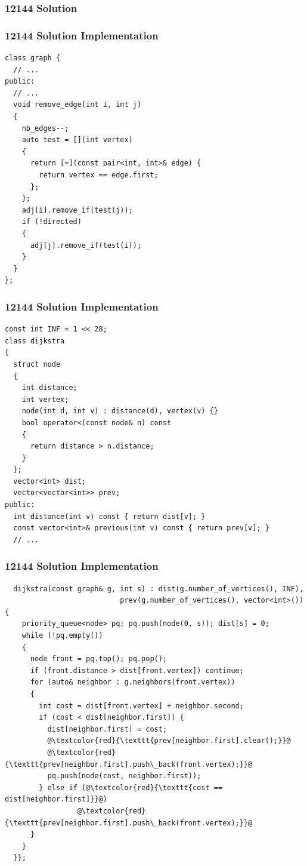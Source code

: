 \documentclass{beamer}
\begin{document}
\begin{frame}[containsverbatim]
\frametitle{12144 Solution}

\end{frame}

\begin{frame}[containsverbatim]
\frametitle{12144 Solution Implementation}
\scriptsize
\begin{lstlisting}
class graph {
  // ...
public:
  // ...
  void remove_edge(int i, int j)
  {
    nb_edges--;
    auto test = [](int vertex)
    {
      return [=](const pair<int, int>& edge) {
        return vertex == edge.first;
      };
    };
    adj[i].remove_if(test(j));
    if (!directed)
    {
      adj[j].remove_if(test(i));
    }
  }
};
\end{lstlisting}

\end{frame}

\begin{frame}[containsverbatim]
\frametitle{12144 Solution Implementation}
\scriptsize
\begin{lstlisting}
const int INF = 1 << 28;
class dijkstra
{
  struct node
  {
    int distance;
    int vertex;
    node(int d, int v) : distance(d), vertex(v) {}
    bool operator<(const node& n) const
    {
      return distance > n.distance;
    }
  };
  vector<int> dist;
  vector<vector<int>> prev;
public:
  int distance(int v) const { return dist[v]; }
  const vector<int>& previous(int v) const { return prev[v]; }
  // ...
\end{lstlisting}

\end{frame}

\begin{frame}[containsverbatim]
\frametitle{12144 Solution Implementation}
\scriptsize
\begin{lstlisting}
  dijkstra(const graph& g, int s) : dist(g.number_of_vertices(), INF),
                           prev(g.number_of_vertices(), vector<int>()) {
    priority_queue<node> pq; pq.push(node(0, s)); dist[s] = 0;
    while (!pq.empty())
    {
      node front = pq.top(); pq.pop();
      if (front.distance > dist[front.vertex]) continue;
      for (auto& neighbor : g.neighbors(front.vertex))
      {
        int cost = dist[front.vertex] + neighbor.second;
        if (cost < dist[neighbor.first]) {
          dist[neighbor.first] = cost;
          @\textcolor{red}{\texttt{prev[neighbor.first].clear();}}@
          @\textcolor{red}{\texttt{prev[neighbor.first].push\_back(front.vertex);}}@
          pq.push(node(cost, neighbor.first));
        } else if (@\textcolor{red}{\texttt{cost == dist[neighbor.first]}}@)
                 @\textcolor{red}{\texttt{prev[neighbor.first].push\_back(front.vertex);}}@
      }
    }
  }};
\end{lstlisting}

\end{frame}
\end{document}
